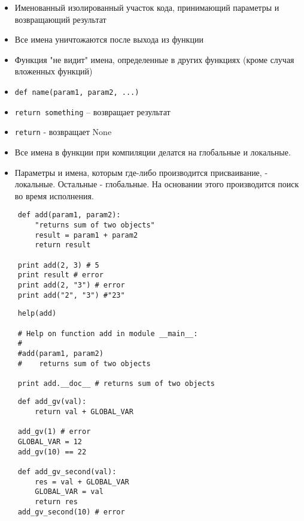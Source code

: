 \documentclass{article}
\begin{document}
\LARGE

\begin{itemize}
	\item Именованный изолированный участок кода,
		принимающий параметры и возвращающий результат
	\item Все имена уничтожаются после выхода из функции
	\item Функция "не видит" имена, определенные в других 
		функциях (кроме случая вложенных функций)
	\item \lstinline!def name(param1, param2, ...)!
	\item \lstinline!return something! – возвращает результат
	\item \lstinline!return! - возвращает None
\end{itemize}
\newpage

\begin{itemize}
	\item Все имена в функции при компиляции делатся на глобальные и локальные.
	\item Параметры и имена, которым где-либо производится присваивание, - локальные.
		  Остальные - глобальные. На основании этого производится поиск во время исполнения.
\end{itemize}
\vspace{15pt}
\begin{lstlisting}
	def add(param1, param2):
		"returns sum of two objects"
	    result = param1 + param2
	    return result

	print add(2, 3) # 5
	print result # error
	print add(2, "3") # error
	print add("2", "3") #"23"
\end{lstlisting}
\newpage

\vspace{15pt}
\begin{lstlisting}
	help(add)
	
	# Help on function add in module __main__:
	#
	#add(param1, param2)
    #    returns sum of two objects

	print add.__doc__ # returns sum of two objects
\end{lstlisting}
\newpage

\vspace{15pt}
\begin{lstlisting}
	def add_gv(val):
	    return val + GLOBAL_VAR

	add_gv(1) # error
	GLOBAL_VAR = 12
	add_gv(10) == 22

	def add_gv_second(val):
	    res = val + GLOBAL_VAR
	    GLOBAL_VAR = val
	    return res
	add_gv_second(10) # error
\end{lstlisting}
\newpage
\end{document}
